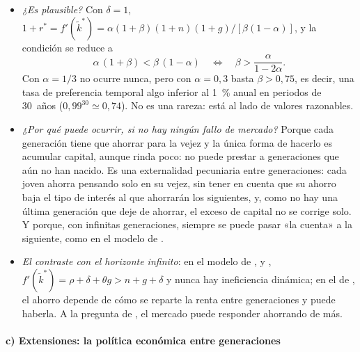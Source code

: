 \documentclass[11pt]{article}
\begin{document}
\begin{itemize}
\begin{figure}[H]
  \end{figure}
\item \emph{¿Es plausible?} Con $\delta=1$, $1+r^*=f'(\tilde k^*)=\alpha(1+\beta)(1+n)(1+g)/[\beta(1-\alpha)]$, y la condición se reduce a
  \begin{equation*}
  \alpha\,(1+\beta)<\beta\,(1-\alpha)\quad\Longleftrightarrow\quad\beta>\frac{\alpha}{1-2\alpha}.
  \end{equation*}
  Con $\alpha=1/3$ no ocurre nunca, pero con $\alpha=0{,}3$ basta $\beta>0{,}75$, es decir, una tasa de preferencia temporal algo inferior al 1~\% anual en periodos de 30~años ($0{,}99^{30}\simeq0{,}74$). No es una rareza: está al lado de valores razonables.
\item \emph{¿Por qué puede ocurrir, si no hay ningún fallo de mercado?} Porque cada generación tiene que ahorrar para la vejez y la única forma de hacerlo es acumular capital, aunque rinda poco: no puede prestar a generaciones que aún no han nacido. Es una externalidad pecuniaria entre generaciones: cada joven ahorra pensando solo en su vejez, sin tener en cuenta que su ahorro baja el tipo de interés al que ahorrarán los siguientes, y, como no hay una última generación que deje de ahorrar, el exceso de capital no se corrige solo. Y porque, con infinitas generaciones, siempre se puede pasar «la cuenta» a la siguiente, como en el modelo de .
\item \emph{El contraste con el horizonte infinito}: en el modelo de ,  y , $f'(\tilde k^*)=\rho+\delta+\theta g>n+g+\delta$ y nunca hay ineficiencia dinámica; en el de , el ahorro depende de cómo se reparte la renta entre generaciones y puede haberla. A la pregunta de , el mercado puede responder ahorrando de más.
\end{itemize}

\paragraph{c) Extensiones: la política económica entre generaciones}
\end{document}
